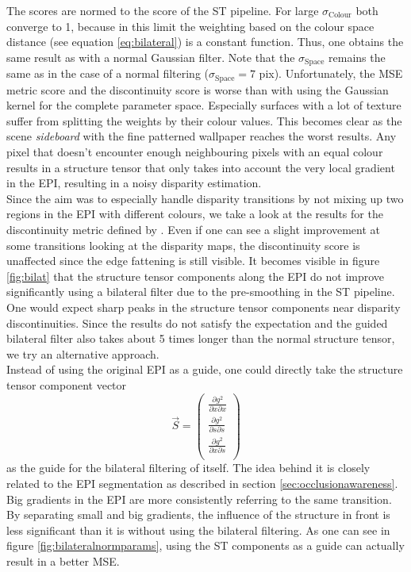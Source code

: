 \documentclass  [
  paper    = a4,
  BCOR     = 10mm,
  twoside,
  fontsize = 12pt,
  fleqn,
  toc      = bibnumbered,
  toc      = listofnumbered,
  numbers  = noendperiod,
  headings = normal,
  listof   = leveldown,
  version  = 3.03
]                                       {scrreprt}
\begin{document}
 The scores are normed to the score of the ST pipeline. For large $\sigma_\text{Colour}$ both converge to 1, because in this limit the weighting based on the colour space distance (see equation \ref{eq:bilateral}) is a constant function. Thus, one obtains the same result as with a normal Gaussian filter. Note that the $\sigma_\text{Space}$ remains the same as in the case of a normal filtering ($\sigma_\text{Space}=7$ pix). Unfortunately, the MSE metric score and the discontinuity score is worse than with using the Gaussian kernel for the complete parameter space. Especially surfaces with a lot of texture suffer from splitting the weights by their colour values. This becomes clear as the scene \textit{sideboard} with the fine patterned wallpaper reaches the worst results. Any pixel that doesn't encounter enough neighbouring pixels with an equal colour results in a  structure tensor that only takes into account the very local gradient in the EPI, resulting in a noisy disparity estimation.\\
  Since the aim was to especially handle disparity transitions by not mixing up two regions in the EPI with different colours, we take a look at the results for the discontinuity metric defined by \cite{honauer2016benchmark}. Even if one can see a slight improvement at some transitions looking at the disparity maps, the discontinuity score is unaffected since the edge fattening is still visible. It becomes visible in figure \ref{fig:bilat} that the structure tensor components along the EPI do not improve significantly using a bilateral filter due to the pre-smoothing in the ST pipeline. One would expect sharp peaks in the structure tensor components near disparity discontinuities. Since the results do not satisfy the expectation and the guided bilateral filter also takes about 5 times longer than the normal structure tensor, we try an alternative approach.\\
 Instead of using the original EPI as a guide, one could directly take the structure tensor component vector 
 \begin{equation}\label{key}
 \vec S = \left(\begin{matrix}
 \frac{\partial g^2}{\partial x \partial x} \\
 \frac{\partial g^2}{\partial s \partial s} \\
 \frac{\partial g^2}{\partial x \partial s} \\
 \end{matrix}\right)
 \end{equation}
 as the guide for the bilateral filtering of itself. The idea behind it is closely related to the EPI segmentation as described in section \ref{sec:occlusionawareness}. Big gradients in the EPI are more consistently referring to the same transition. By separating small and big gradients, the influence of the structure in front is less significant than it is without using the bilateral filtering. As one can see in figure \ref{fig:bilateralnormparams}, using the ST components as a guide can actually result in a better MSE. 
\end{document}
